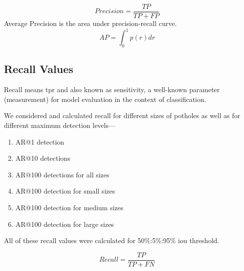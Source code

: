             $$Precision = \frac{TP}{TP+FP}$$
            Average Precision is the area under precision-recall curve.
            $$AP = \int_{0}^{1}p(r) dr$$
            
        \subsection{Recall Values}
            Recall means \acrlong{tpr} and also known as sensitivity, a well-known parameter (measurement) for model evaluation in the context of classification\cite{wiki:precision_recall}.
            
            We considered and calculated recall for different  sizes of potholes as well as for different maximum detection levels---
            \begin{enumerate}
             \item AR@1 detection
             \item AR@10 detections
             \item AR@100 detections for all sizes
             \item AR@100 detection for small sizes
             \item AR@100 detection for medium sizes
             \item AR@100 detection for large sizes
            \end{enumerate}
            All of these recall values were calculated for 50\%:5\%:95\% \acrshort{iou}\cite{lin2014microsoft} threshold.
            
            $$Recall = \frac{TP}{TP+FN}$$
                
    

    
